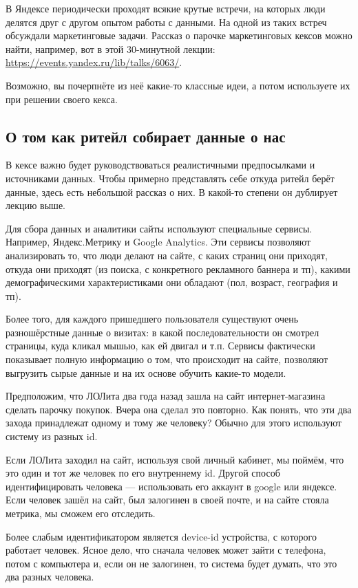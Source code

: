 \documentclass[12pt, a4paper, oneside]{article}
\begin{document}
В Яндексе периодически проходят всякие крутые встречи, на которых люди делятся друг с другом опытом работы с данными. На одной из таких встреч обсуждали маркетинговые задачи. Рассказ о парочке маркетинговых кексов можно найти, например, вот в этой 30-минутной лекции: \url{ https://events.yandex.ru/lib/talks/6063/}.  

Возможно, вы почерпнёте из неё какие-то классные идеи, а потом используете их при решении своего кекса. 

\subsection*{О том как ритейл собирает данные о нас}

В кексе важно будет руководствоваться реалистичными предпосылками и источниками данных. Чтобы примерно представлять себе откуда ритейл берёт данные, здесь есть небольшой рассказ о них. В какой-то степени он дублирует лекцию выше. 

Для сбора данных и аналитики сайты используют специальные сервисы. Например, Яндекс.Метрику и Google Analytics. Эти сервисы позволяют анализировать то, что люди делают на сайте, с каких страниц они приходят, откуда они приходят (из поиска, с конкретного рекламного баннера и тп), какими демографическими характеристиками они обладают (пол, возраст, география и тп). 

Более того, для каждого пришедшего пользователя существуют очень разношёрстные данные о визитах: в какой последовательности он смотрел страницы, куда кликал мышью, как ей двигал и т.п.  Сервисы фактически показывает полную информацию о том, что происходит на сайте, позволяют выгрузить сырые данные и на их основе обучить какие-то модели. 

Предположим, что ЛОЛита два года назад зашла на сайт интернет-магазина сделать парочку покупок. Вчера она сделал это повторно. Как понять, что эти два захода принадлежат одному и тому же человеку? Обычно для этого используют систему из разных id. 

Если ЛОЛита заходил на сайт, используя свой личный кабинет, мы поймём, что это один и тот же человек по его внутреннему id. Другой способ идентифицировать человека --- использовать его аккаунт в google или яндексе.  Если человек зашёл на сайт, был залогинен в своей почте, и на сайте стояла метрика, мы сможем его отследить. 

Более слабым идентификатором является device-id устройства, с которого работает человек. Ясное дело, что сначала человек может зайти с телефона, потом с компьютера и, если он не залогинен, то система будет думать, что это два разных человека. 
\end{document}
